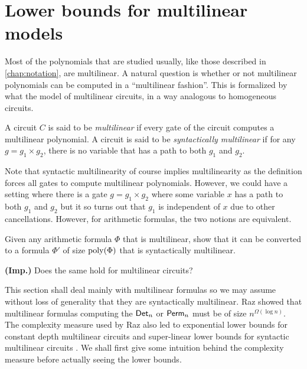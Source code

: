\chapter{Lower bounds for multilinear models}\label{chap:multilinear}

Most of the polynomials that are studied usually, like those described in \autoref{chap:notation}, are multilinear. 
A natural question is whether or not multilinear polynomials can be computed in a ``multilinear fashion''. 
This is formalized by what the model of multilinear circuits, in a way analogous to homogeneous circuits. 

\begin{definition}
A circuit $C$ is said to be \emph{multilinear} if every gate of the circuit computes a multilinear polynomial. 
A circuit is said to be \emph{syntactically multilinear} if for any $g = g_1 \times g_2$, there is no variable that has a path to both $g_1$ and $g_2$. 
\end{definition}

Note that syntactic multilinearity of course implies multilinearity as the definition forces all gates to compute multilinear polynomials. 
However, we could have a setting where there is a gate $g = g_1 \times g_2$ where some variable $x$ has a path to both $g_1$ and $g_2$ but it so turns out that $g_1$ is independent of $x$ due to other cancellations. 
However, for arithmetic formulas, the two notions are equivalent. 

\begin{exercise}
Given any arithmetic formula $\Phi$ that is multilinear, show that it can be converted to a formula $\Phi'$ of size $\operatorname{poly}(\Phi)$ that is syntactically multilinear. 

\noindent
{\bf (Imp.)} Does the same hold for multilinear circuits? 
\end{exercise}

This section shall deal mainly with multilinear formulas so we may assume without loss of generality that they are syntactically multilinear. 
Raz \cite{raz2004} showed that multilinear formulas computing the $\operatorname{\mathsf{Det}}_n$ or $\operatorname{\mathsf{Perm}}_n$ must be of size $n^{\Omega(\log n)}$. 
The complexity measure used by Raz also led to exponential lower bounds for constant depth multilinear circuits \cite{raz-yehudayoff} and super-linear lower bounds for syntactic multilinear circuits \cite{RSY08}. 
We shall first give some intuition behind the complexity measure before actually seeing the lower bounds. 

